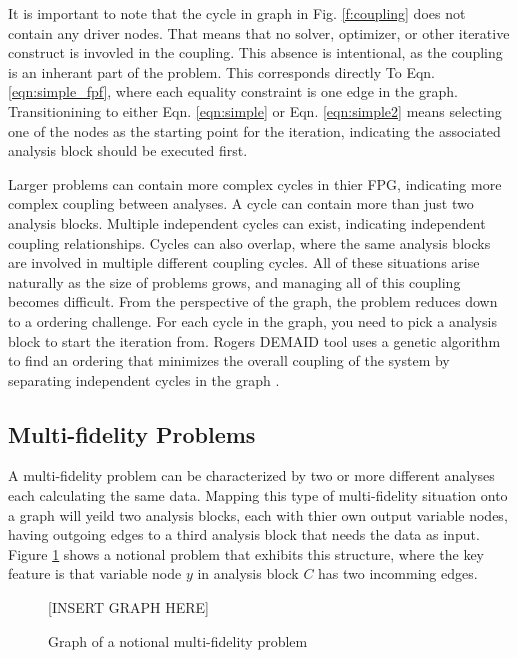   It is important to note that the cycle in graph in Fig. \ref{f:coupling} does not contain 
  any driver nodes. That means that no solver, optimizer, or other iterative construct is 
  invovled in the coupling. This absence is intentional, as the coupling is an inherant part 
  of the problem. This corresponds directly To Eqn. \ref{eqn:simple_fpf}, where 
  each equality constraint is one edge in the graph. Transitionining to either 
  Eqn. \ref{eqn:simple} or Eqn. \ref{eqn:simple2} means selecting one of the nodes as the starting point 
  for the iteration, indicating the associated analysis block should be executed first. 

  Larger problems can contain more complex cycles in thier FPG, indicating more 
  complex coupling between analyses. A cycle can contain more than 
  just two analysis blocks. Multiple independent cycles can exist, indicating 
  independent coupling relationships. Cycles can also overlap, where the same analysis 
  blocks are involved in multiple different coupling cycles. All of these situations
  arise naturally as the size of problems grows, and managing all of this coupling 
  becomes difficult. From the perspective of the graph, the problem reduces down to 
  a ordering challenge. For each cycle in the graph, you need to pick a analysis block
  to start the iteration from. Rogers DEMAID tool uses a genetic algorithm to find an ordering 
  that minimizes the overall coupling of the system by separating independent 
  cycles in the graph \cite{rogers1996,rogers1996demaid}. 


\subsection{Multi-fidelity Problems}
  
  A multi-fidelity problem can be characterized by two or more different analyses 
  each calculating the same data. Mapping this type of multi-fidelity situation 
  onto a graph will yeild two analysis blocks, each with thier own output 
  variable nodes, having outgoing edges to a third analysis block that needs the 
  data as input. Figure \ref{f:collision-example} shows a notional problem 
  that exhibits this structure, where the key feature is that variable node $y$ in 
  analysis block $C$ has two incomming edges. 

  \begin{figure}
      \begin{center}
      [INSERT GRAPH HERE]
      \caption{Graph of a notional multi-fidelity problem \label{f:collision-example}}
      \end{center}
  \end{figure}

